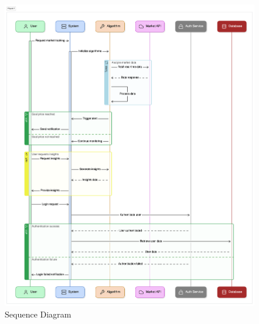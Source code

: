 \begin{figure}
    \centering
    \includegraphics[width=1.1\textwidth]{Graphics/sequence.png}
    \caption{Sequence Diagram}
    \label{fig:enter-label}
\end{figure}
    

